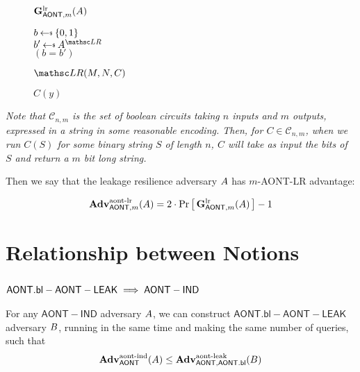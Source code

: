 \documentclass[11pt,twoside]{article}
\begin{document}
\begin{figure}[H]
{
\underline{$\mathbf{G}_{\mathsf{AONT},m}^\text{lr}(A)$}

\begin{algorithm}[H]
$b \getsr \bits$\\
$b' \getsr \advA^{\LRO}$\\
\Return $(b=b')$
\end{algorithm}

\smallskip
\underline{$\LRO(M,N,C)$}

\begin{algorithm}[H]
\Return $C(y)$
\end{algorithm}
}
\end{figure}

\emph{Note that $\mathcal{C}_{n,m}$ is the set of boolean circuits taking $n$ inputs and $m$ outputs, expressed in a string in some reasonable encoding. Then, for $C\in \mathcal{C}_{n,m}$, when we run $C(S)$ for some binary string $S$ of length $n$, $C$ will take as input the bits of $S$ and return a $m$ bit long string.}

Then we say that the leakage resilience adversary $A$ has $m$-AONT-LR advantage: 

$$\textbf{Adv}^\text{aont-lr}_{\mathsf{AONT},m}(A)=2\cdot{\Pr\left[\,{\mathbf{G}_{\mathsf{AONT},m}^\text{lr}(A)}\,\right]} - 1$$

\section{Relationship between Notions} 

\subsection{$\mathsf{AONT.bl-AONT-LEAK}\implies\mathsf{AONT-IND}$}

\begin{theorem}
For any $\mathsf{AONT-IND}$ adversary $A$, we can construct $\mathsf{AONT.bl-AONT-LEAK}$ adversary $B$, running in the same time and making the same number of queries, such that $$\textbf{Adv}^\text{aont-ind}_{\mathsf{AONT}}(A)\le\textbf{Adv}^\text{aont-leak}_{\mathsf{AONT},\mathsf{AONT.bl}}(B)$$
\end{theorem}
\end{document}
